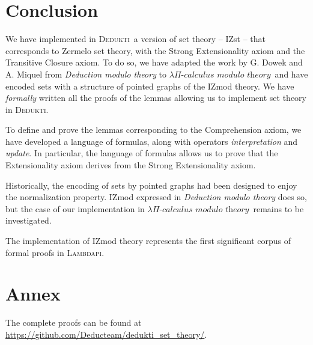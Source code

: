 \documentclass[submission,copyright,creativecommons]{eptcs}
\newcommand{\dedukti}{\textsc{Dedukti}}
\newcommand{\lpcm}{$\lambda \Pi\textit{-calculus modulo theory}$}
\begin{document}
\section{Conclusion}

We have implemented in \dedukti ~a version of set theory -- IZst -- that corresponds to Zermelo set theory, with the Strong Extensionality axiom and the Transitive Closure axiom. To do so, we have adapted the work by G. Dowek and A. Miquel \cite{zermodulo} from \textit{Deduction modulo theory} to \lpcm ~and have encoded sets with a structure of pointed graphs of the IZmod theory. We have \textit{formally} written all the proofs of the lemmas allowing us to implement set theory in \dedukti.

To define and prove the lemmas corresponding to the Comprehension axiom, we have developed a language of formulas, along with operators \textit{interpretation} and \textit{update}. In particular, the language of formulas allows us to prove that the Extensionality axiom derives from the Strong Extensionality axiom.

Historically, the encoding of sets by pointed graphs had been designed to enjoy the normalization property. IZmod expressed in \textit{Deduction modulo theory} does so, but the case of our implementation in \lpcm ~remains to be investigated.

The implementation of IZmod theory represents the first significant corpus of formal proofs in \textsc{Lambdapi}.

\newpage
\section*{Annex}

The complete proofs can be found at \url{https://github.com/Deducteam/dedukti_set_theory/}. 
\end{document}
